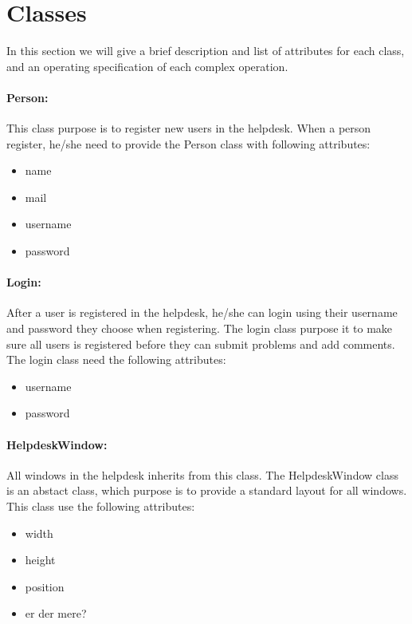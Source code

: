 \section{Classes}
In this section we will give a brief description and list of attributes for each class, and an operating specification of each complex operation.

 \paragraph{Person:}This class purpose is to register new users in the helpdesk. When a person register, he/she need to provide the Person class with following attributes:
\begin{itemize}
 \item{name}
 \item{mail}
 \item{username}
 \item{password}
\end{itemize}
 
 \paragraph{Login:}After a user is registered in the helpdesk, he/she can login using their username and password they choose when registering. The login class purpose it to make sure all users is registered before they can submit problems and add comments. The login class need the following attributes: 
\begin{itemize}
 \item{username}
 \item{password}
\end{itemize}
 
 \paragraph{HelpdeskWindow:} All windows in the helpdesk inherits from this class. The HelpdeskWindow class is an abstact class, which purpose is to provide a standard layout for all windows. This class use the following attributes: 
\begin{itemize}
 \item{width}
 \item{height}
 \item{position}
 \item{er der mere?}
\end{itemize}

